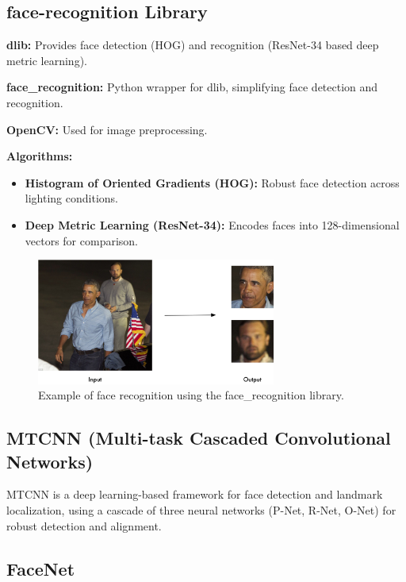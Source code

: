\subsection{face-recognition Library}

\textbf{dlib:} Provides face detection (HOG) and recognition (ResNet-34 based deep metric learning).

\textbf{face\_recognition:} Python wrapper for dlib, simplifying face detection and recognition.

\textbf{OpenCV:} Used for image preprocessing.

\textbf{Algorithms:}
\begin{itemize}
    \item \textbf{Histogram of Oriented Gradients (HOG):} Robust face detection across lighting conditions.
    \item \textbf{Deep Metric Learning (ResNet-34):} Encodes faces into 128-dimensional vectors for comparison.
\end{itemize}

\begin{figure}[ht!]
    \centering
    \includegraphics[width=0.7\textwidth]{../Files/face_recognition_example.png}
    \caption{Example of face recognition using the face\_recognition library.}
    \label{fig:face-recognition-example}
\end{figure}

\subsection{MTCNN (Multi-task Cascaded Convolutional Networks)}

MTCNN is a deep learning-based framework for face detection and landmark localization, using a cascade of three neural networks (P-Net, R-Net, O-Net) for robust detection and alignment.

\subsection{FaceNet}

